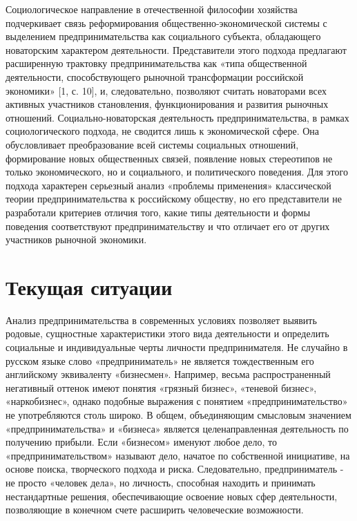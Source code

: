 \documentclass[a4paper, 12pt]{article}%
\begin{document}
Социологическое направление в отечественной философии хозяйства подчеркивает связь реформирования общественно-экономической системы с выделением предпринимательства как социального субъекта, обладающего новаторским характером деятельности. Представители этого подхода предлагают расширенную трактовку предпринимательства как «типа общественной деятельности, способствующего рыночной трансформации российской экономики» [1, с. 10], и, следовательно, позволяют считать новаторами всех активных участников становления, функционирования и развития рыночных отношений.
Социально-новаторская деятельность предпринимательства, в рамках
социологического подхода, не сводится лишь к экономической сфере. Она обусловливает преобразование всей системы социальных отношений, формирование новых общественных связей, появление новых стереотипов не только экономического, но и социального, и политического поведения. Для этого подхода характерен серьезный анализ «проблемы применения» классической теории предпринимательства к российскому обществу, но его представители не разработали критериев отличия того, какие типы деятельности и формы поведения соответствуют предпринимательству и что отличает его от других участников рыночной экономики.

\section{Текущая ситуации}

Анализ предпринимательства в современных условиях позволяет выявить родовые, сущностные характеристики этого вида деятельности и определить социальные и индивидуальные черты личности предпринимателя. Не случайно в русском языке слово «предприниматель» не является тождественным его английскому эквиваленту «бизнесмен». Например, весьма распространенный негативный оттенок имеют понятия «грязный бизнес», «теневой бизнес», «наркобизнес», однако подобные выражения с понятием «предпринимательство» не употребляются столь широко. В общем, объединяющим смысловым значением «предпринимательства» и «бизнеса» является целенаправленная деятельность по получению прибыли. Если «бизнесом» именуют любое дело, то «предпринимательством» называют дело, начатое по собственной инициативе, на основе поиска, творческого подхода и риска. Следовательно, предприниматель - не просто «человек дела», но личность, способная находить и принимать нестандартные решения, обеспечивающие освоение новых сфер деятельности, позволяющие в конечном счете расширить человеческие возможности.
\end{document}
